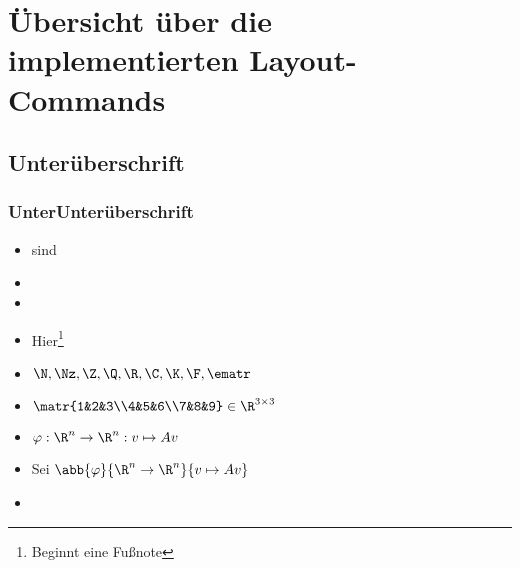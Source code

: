 \section{Übersicht über die implementierten Layout-Commands}
\subsection{Unterüberschrift}
\subsubsection{UnterUnterüberschrift}
\begin{itemize}
    \item {} sind 
    \item {}
    \item {}
    \item Hier\footnote{Beginnt eine Fußnote}
    
    \item $\N, \Nz, \Z, \Q, \R, \C, \K, \F, \ematr$
    \item $\matr{1&2&3\\4&5&6\\7&8&9}\in\R^{3\times 3}$
    
    \item $\varphi: \R^n\to\R^n: v\mapsto Av$
    
    \item Sei $\abb{\varphi}{\R^n\to\R^n}{v\mapsto Av}$ %
    
    \item {}
\end{itemize}